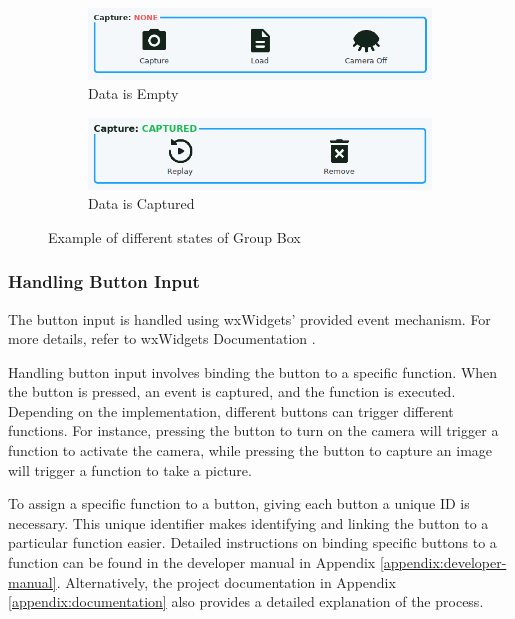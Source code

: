 \begin{figure}[ht!]
    \centering
    \begin{subfigure}[c]{0.8\textwidth}
        \begin{minipage}{\textwidth}
            \centering
            \includegraphics[height=2 cm]{texs/Part2/chapter4/image/ok10.png}
        \end{minipage}
        \caption{Data is Empty}
        \label{fig:group_empty}
    \end{subfigure}
    \begin{subfigure}[c]{0.8\textwidth}
        \begin{minipage}{\textwidth}
            \centering
            \includegraphics[height=2 cm]{texs/Part2/chapter4/image/ok11.png}
        \end{minipage}
        \caption{Data is Captured}
        \label{fig:group_captured}
    \end{subfigure}
    \caption{Example of different states of Group Box}
    \label{fig:group_state}
\end{figure}

\subsubsection{Handling Button Input}
\label{subsubsec:handling_button_input}
The button input is handled using wxWidgets' provided event mechanism. For more details, refer to wxWidgets Documentation \cite{wxWidgetsEvent}.

Handling button input involves binding the button to a specific function. When the button is pressed, an event is captured, and the function is executed. Depending on the implementation, different buttons can trigger different functions. For instance, pressing the button to turn on the camera will trigger a function to activate the camera, while pressing the button to capture an image will trigger a function to take a picture.

To assign a specific function to a button, giving each button a unique ID is necessary. This unique identifier makes identifying and linking the button to a particular function easier. Detailed instructions on binding specific buttons to a function can be found in the developer manual in Appendix \ref{appendix:developer-manual}. Alternatively, the project documentation in Appendix \ref{appendix:documentation} also provides a detailed explanation of the process.

